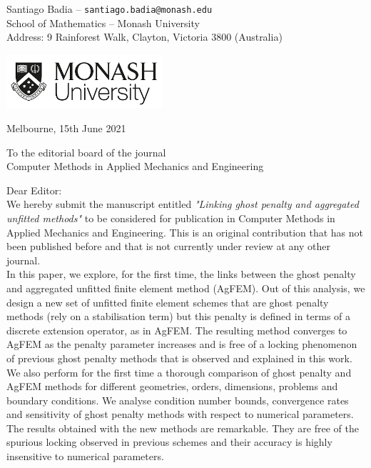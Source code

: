 \documentclass[a4paper,11pt,twoside]{article}
\begin{document}
\pagestyle{fancy}

\begin{flushleft}
    Santiago Badia -- \texttt{santiago.badia@monash.edu} \\
    School of Mathematics -- Monash University \\
    Address: 9 Rainforest Walk, Clayton, Victoria 3800 (Australia) \\
\end{flushleft}

\begin{flushright}
    \includegraphics[height=2.0cm]{monash-logo.png}
\end{flushright}

\begin{flushright}
    Melbourne, 15th June 2021
\end{flushright}

\begin{flushleft}
To the editorial board of the journal\\ Computer Methods in Applied Mechanics
and Engineering
\end{flushleft}

Dear Editor:\\

We hereby submit the manuscript entitled \emph{"Linking ghost penalty and aggregated unfitted methods"} to be
considered for publication in Computer Methods in Applied Mechanics and
Engineering. This is an original contribution that has not been published before
and that is not currently under review at any other journal.\\

In this paper, we explore, for the first time, the links between 
the ghost penalty and aggregated unfitted finite element method (AgFEM). 
Out of this analysis, we design a new set of unfitted finite element schemes
that are ghost penalty methods (rely on a stabilisation term) but this penalty
is defined in terms of a discrete extension operator, as in AgFEM.
The resulting method converges to AgFEM as the penalty parameter increases and
is free of a locking phenomenon of previous ghost penalty methods that is observed and explained in this work.\\

We also perform for the first time a thorough comparison of ghost penalty and AgFEM methods for 
different geometries, orders, dimensions, problems and boundary conditions. 
We analyse condition number bounds, convergence rates and sensitivity of ghost penalty methods with respect
to numerical parameters. The results obtained with the new methods are remarkable.
They are free of the spurious locking observed in previous schemes and their accuracy is highly insensitive to numerical parameters.\\
\end{document}
